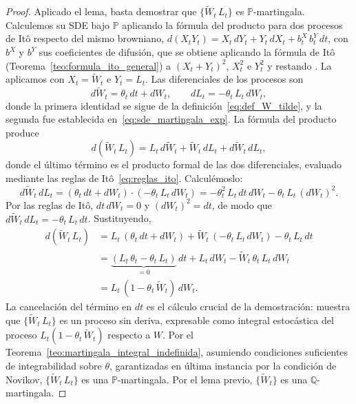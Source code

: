 \documentclass[11pt,a4paper,oneside]{report}
\theoremstyle{plain}
\theoremstyle{definition}
\theoremstyle{remark}
\newcommand{\PP}{\mathbb{P}}
\newcommand{\Q}{\mathbb{Q}}
\newcommand{\1}{\mathbf{1}}
\begin{document}
\begin{proof}
Aplicado el lema, basta demostrar que $\{\widetilde{W}_t\, L_t\}$ es
$\PP$-martingala. Calculemos su SDE bajo $\PP$ aplicando la fórmula
del producto para dos procesos de Itô respecto del mismo browniano,
$d(X_t Y_t) = X_t\, dY_t + Y_t\, dX_t + b^X_t\, b^Y_t\, dt$, con $b^X$ y $b^Y$ sus
coeficientes de difusión, que se obtiene aplicando la fórmula de Itô
(Teorema~\ref{teo:formula_ito_general}) a $(X_t + Y_t)^2$, $X_t^2$ e $Y_t^2$ y
restando \cite[Teorema~4.4.2]{etheridge}. La aplicamos con
$X_t = \widetilde{W}_t$ e $Y_t = L_t$. Las
diferenciales de los procesos son
\begin{equation*}
  d\widetilde{W}_t = \theta_t\, dt + dW_t, \qquad
  dL_t = -\theta_t\, L_t\, dW_t,
\end{equation*}
donde la primera identidad se sigue de la
definición~\eqref{eq:def_W_tilde}, y la segunda fue establecida
en~\eqref{eq:sde_martingala_exp}. La fórmula del producto produce
\begin{equation*}
  d(\widetilde{W}_t\, L_t)
  = L_t\, d\widetilde{W}_t + \widetilde{W}_t\, dL_t
   + d\widetilde{W}_t\, dL_t,
\end{equation*}
donde el último término es el producto formal de las dos
diferenciales, evaluado mediante las reglas de
Itô~\eqref{eq:reglas_ito}. Calculémoslo:
\begin{equation*}
  d\widetilde{W}_t\, dL_t
  = (\theta_t\, dt + dW_t) \cdot (-\theta_t\, L_t\, dW_t)
  = -\theta_t^2\, L_t\, dt\, dW_t - \theta_t\, L_t\, (dW_t)^2.
\end{equation*}
Por las reglas de Itô, $dt\, dW_t = 0$ y $(dW_t)^2 = dt$, de modo que
$d\widetilde{W}_t\, dL_t = -\theta_t\, L_t\, dt$. Sustituyendo,
\begin{align*}
  d(\widetilde{W}_t\, L_t)
  &= L_t\,(\theta_t\, dt + dW_t)
   + \widetilde{W}_t\, (-\theta_t\, L_t\, dW_t)
   - \theta_t\, L_t\, dt \\
  &= \underbrace{(L_t\, \theta_t - \theta_t\, L_t)}_{= 0}\, dt
   + L_t\, dW_t - \widetilde{W}_t\, \theta_t\, L_t\, dW_t \\
  &= L_t\, (1 - \theta_t\, \widetilde{W}_t)\, dW_t.
\end{align*}
La cancelación del término en $dt$ es el cálculo crucial de la
demostración: muestra que $\{\widetilde{W}_t\, L_t\}$ es un proceso
sin deriva, expresable como integral estocástica del proceso $L_t (1 -
\theta_t\, \widetilde{W}_t)$ respecto a $W$. Por el
Teorema~\ref{teo:martingala_integral_indefinida}, asumiendo
condiciones suficientes de integrabilidad sobre $\theta$, garantizadas
en última instancia por la condición de Novikov, $\{\widetilde{W}_t\,
L_t\}$ es una $\PP$-martingala. Por el lema previo, $\{\widetilde{W}_t\}$
es una $\Q$-martingala.


\end{proof}
\end{document}
